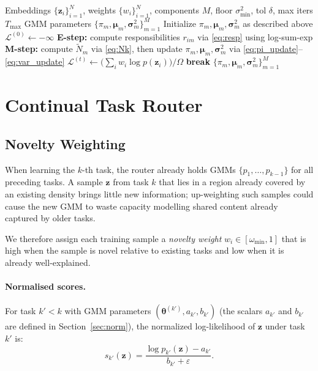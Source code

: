 \documentclass[12pt,a4paper]{article}
\begin{document}
\begin{algorithm}[t]
\caption{Weighted EM for Diagonal GMM}
\label{alg:wem}
\begin{algorithmic}[1]
\Require Embeddings $\{\mathbf{z}_i\}_{i=1}^N$, weights $\{w_i\}_{i=1}^N$, components $M$, floor $\sigma^2_{\min}$, tol $\delta$, max iters $T_{\max}$
\Ensure GMM parameters $\{\pi_m, \bm{\mu}_m, \bm{\sigma}_m^2\}_{m=1}^M$
\State Initialize $\pi_m, \bm{\mu}_m, \bm{\sigma}_m^2$ as described above
\State $\mathcal{L}^{(0)} \gets -\infty$
    \State \textbf{E-step:} compute responsibilities $r_{im}$ via \eqref{eq:resp} using log-sum-exp
    \State \textbf{M-step:} compute $\tilde{N}_m$ via \eqref{eq:Nk}, then update $\pi_m, \bm{\mu}_m, \bm{\sigma}_m^2$ via \eqref{eq:pi_update}--\eqref{eq:var_update}
    \State $\mathcal{L}^{(t)} \gets \bigl(\sum_i w_i \log p(\mathbf{z}_i)\bigr) / \Omega$
        \State \textbf{break}
    \EndIf
\EndFor
\State \Return $\{\pi_m, \bm{\mu}_m, \bm{\sigma}_m^2\}_{m=1}^M$
\end{algorithmic}
\end{algorithm}

\section{Continual Task Router}
\label{sec:router}

\subsection{Novelty Weighting}
\label{sec:novelty}

When learning the $k$-th task, the router already holds GMMs $\{p_1, \ldots, p_{k-1}\}$ for all preceding tasks.
A sample $\mathbf{z}$ from task $k$ that lies in a region already covered by an existing density brings little new information; up-weighting such samples could cause the new GMM to waste capacity modelling shared content already captured by older tasks.

We therefore assign each training sample a \emph{novelty weight} $w_i \in [\omega_{\min}, 1]$ that is high when the sample is novel relative to existing tasks and low when it is already well-explained.

\paragraph{Normalised scores.}
For task $k' < k$ with GMM parameters $(\bm{\theta}^{(k')}, a_{k'}, b_{k'})$
(the scalars $a_{k'}$ and $b_{k'}$ are defined in Section~\ref{sec:norm}),
the normalized log-likelihood of $\mathbf{z}$ under task $k'$ is:
\begin{equation}
    s_{k'}(\mathbf{z}) = \frac{\log p_{k'}(\mathbf{z}) - a_{k'}}{b_{k'} + \varepsilon}.
    \label{eq:score}
\end{equation}
\end{document}
